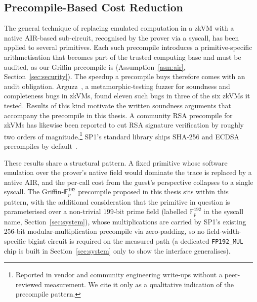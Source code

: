 \subsection{Precompile-Based Cost Reduction}
The general technique of replacing emulated computation in a zkVM with a native AIR-based sub-circuit, recognised by the prover via a syscall, has been applied to several primitives. Each such precompile introduces a primitive-specific arithmetisation that becomes part of the trusted computing base and must be audited, as our Griffin precompile is (Assumption~\ref{asm:air}, Section~\ref{sec:security}). The speedup a precompile buys therefore comes with an audit obligation. Arguzz~\cite{hochrainer2025arguzz}, a metamorphic-testing fuzzer for soundness and completeness bugs in zkVMs, found eleven such bugs in three of the six zkVMs it tested. Results of this kind motivate the written soundness arguments that accompany the precompile in this thesis.
A community RSA precompile for zkVMs has likewise been reported to cut RSA signature verification by roughly two orders of magnitude.\footnote{Reported in vendor and community engineering write-ups without a peer-reviewed measurement. We cite it only as a qualitative indication of the precompile pattern.}
SP1's standard library ships SHA-256 and ECDSA precompiles by default~\cite{succinct2024sp1}.

These results share a structural pattern. A fixed primitive whose software emulation over the prover's native field would dominate the trace is replaced by a native AIR, and the per-call cost from the guest's perspective collapses to a single syscall. The Griffin-$\mathbb{F}_p^{192}$ precompile proposed in this thesis sits within this pattern, with the additional consideration that the primitive in question is parameterised over a non-trivial $199$-bit prime field (labelled $\mathbb{F}_p^{192}$ in the syscall name, Section~\ref{sec:system}), whose multiplications are carried by SP1's existing $256$-bit modular-multiplication precompile via zero-padding, so no field-width-specific bigint circuit is required on the measured path (a dedicated \texttt{FP192\_MUL} chip is built in Section~\ref{sec:system} only to show the interface generalises).

